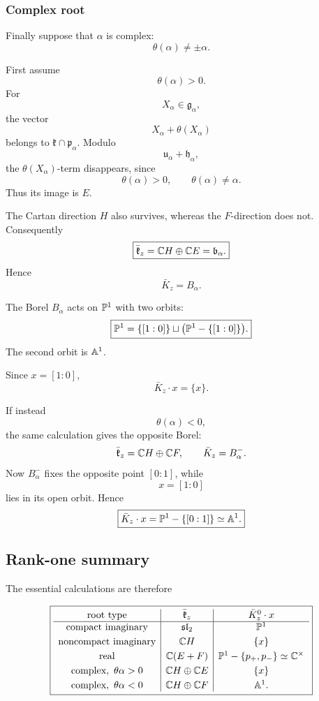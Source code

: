 \subsubsection*{Complex root}

Finally suppose that $\alpha$ is complex:
\[
\theta(\alpha)\neq\pm\alpha.
\]

First assume
\[
\theta(\alpha)>0.
\]
For
\[
X_\alpha\in\mathfrak g_\alpha,
\]
the vector
\[
X_\alpha+\theta(X_\alpha)
\]
belongs to $\mathfrak k\cap\mathfrak p_\alpha$.
Modulo
\[
\mathfrak u_\alpha+\mathfrak h_\alpha,
\]
the $\theta(X_\alpha)$-term disappears, since
\[
\theta(\alpha)>0,
\qquad
\theta(\alpha)\neq\alpha.
\]
Thus its image is $E$.

The Cartan direction $H$ also survives, whereas the $F$-direction does
not. Consequently
\[
\boxed{
\bar{\mathfrak k}_z
=
\mathbb{C} H\oplus\mathbb{C} E
=
\mathfrak b_\alpha.
}
\]
Hence
\[
\bar K_z=B_\alpha.
\]

The Borel $B_\alpha$ acts on $\mathbb{P}^1$ with two orbits:
\[
\boxed{
\mathbb{P}^1
=
\{[1:0]\}
\sqcup
\bigl(\mathbb{P}^1-\{[1:0]\}\bigr).
}
\]
The second orbit is $\mathbb{A}^1$.

Since $x=[1:0]$,
\[
\boxed{
\bar K_z\cdot x=\{x\}.
}
\]

If instead
\[
\theta(\alpha)<0,
\]
the same calculation gives the opposite Borel:
\[
\bar{\mathfrak k}_z
=
\mathbb{C} H\oplus\mathbb{C} F,
\qquad
\bar K_z=B_\alpha^-.
\]
Now $B_\alpha^-$ fixes the opposite point $[0:1]$, while
\[
x=[1:0]
\]
lies in its open orbit. Hence
\[
\boxed{
\bar K_z\cdot x
=
\mathbb{P}^1-\{[0:1]\}
\simeq\mathbb{A}^1.
}
\]

\subsection*{Rank-one summary}

The essential calculations are therefore

\[
\boxed{
\begin{array}{c|c|c}
\text{root type}
&
\bar{\mathfrak k}_z
&
\bar K_z^0\cdot x
\\
\hline
\text{compact imaginary}
&
\mathfrak{sl}_2
&
\mathbb{P}^1
\\[1mm]
\text{noncompact imaginary}
&
\mathbb{C} H
&
\{x\}
\\[1mm]
\text{real}
&
\mathbb{C}(E+F)
&
\mathbb{P}^1-\{p_+,p_-\}\simeq\mathbb{C}^\times
\\[1mm]
\text{complex},\ \theta\alpha>0
&
\mathbb{C} H\oplus\mathbb{C} E
&
\{x\}
\\[1mm]
\text{complex},\ \theta\alpha<0
&
\mathbb{C} H\oplus\mathbb{C} F
&
\mathbb{A}^1.
\end{array}
}
\]

